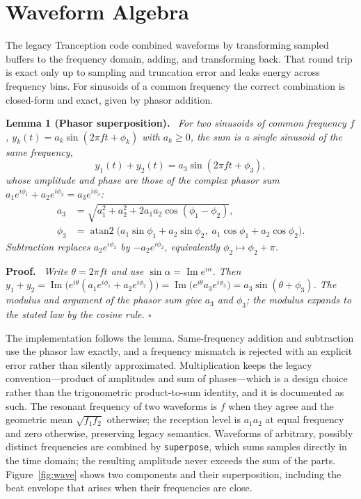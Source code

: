 \documentclass[11pt]{article}
\DeclareMathOperator{\atantwo}{atan2}
\newcommand{\namedthm}[1]{\par\medskip\noindent\textbf{#1.}\ \itshape}
\newcommand{\qed}{\hfill$\square$}
\begin{document}
\section{Waveform Algebra}
\label{sec:waves}

The legacy Tranception code combined waveforms by transforming sampled buffers to the frequency domain, adding, and
transforming back. That round trip is exact only up to sampling and truncation error and leaks energy across
frequency bins. For sinusoids of a common frequency the correct combination is closed-form and exact, given by
phasor addition.

\namedthm{Lemma 1 (Phasor superposition)}
For two sinusoids of common frequency $f$, $y_k(t)=a_k\sin(2\pi f t+\phi_k)$ with $a_k\ge 0$, the sum is a single
sinusoid of the same frequency,
\begin{equation}
y_1(t)+y_2(t)=a_3\sin(2\pi f t+\phi_3),
\end{equation}
\upshape
whose amplitude and phase are those of the complex phasor sum $a_1e^{i\phi_1}+a_2e^{i\phi_2}=a_3e^{i\phi_3}$:
\begin{align}
a_3&=\sqrt{a_1^2+a_2^2+2a_1a_2\cos(\phi_1-\phi_2)},\\
\phi_3&=\atantwo\!\bigl(a_1\sin\phi_1+a_2\sin\phi_2,\;a_1\cos\phi_1+a_2\cos\phi_2\bigr).
\end{align}
Subtraction replaces $a_2e^{i\phi_2}$ by $-a_2e^{i\phi_2}$, equivalently $\phi_2\mapsto\phi_2+\pi$.

\namedthm{Proof}
\upshape
Write $\theta=2\pi f t$ and use $\sin\alpha=\operatorname{Im}e^{i\alpha}$. Then
$y_1+y_2=\operatorname{Im}\!\bigl(e^{i\theta}(a_1e^{i\phi_1}+a_2e^{i\phi_2})\bigr)
=\operatorname{Im}\!\bigl(e^{i\theta}a_3e^{i\phi_3}\bigr)=a_3\sin(\theta+\phi_3)$. The modulus and argument of the
phasor sum give $a_3$ and $\phi_3$; the modulus expands to the stated law by the cosine rule. \qed

\medskip
The implementation follows the lemma. Same-frequency addition and subtraction use the phasor law exactly, and a
frequency mismatch is rejected with an explicit error rather than silently approximated. Multiplication keeps the
legacy convention---product of amplitudes and sum of phases---which is a design choice rather than the trigonometric
product-to-sum identity, and it is documented as such. The resonant frequency of two waveforms is $f$ when they
agree and the geometric mean $\sqrt{f_1 f_2}$ otherwise; the reception level is $a_1a_2$ at equal frequency and zero
otherwise, preserving legacy semantics. Waveforms of arbitrary, possibly distinct frequencies are combined by
\texttt{superpose}, which sums samples directly in the time domain; the resulting amplitude never exceeds the sum of
the parts. Figure~\ref{fig:wave} shows two components and their superposition, including the beat envelope that
arises when their frequencies are close.
\end{document}
